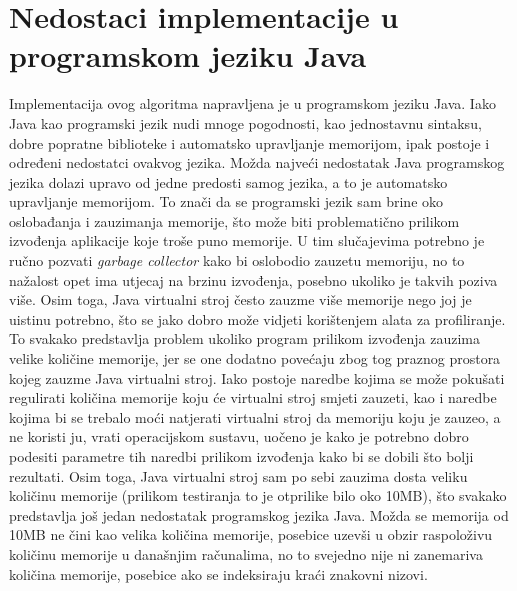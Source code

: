 \section{Nedostaci implementacije u programskom jeziku Java}
Implementacija ovog algoritma napravljena je u programskom jeziku Java.  Iako Java kao programski jezik nudi mnoge pogodnosti, kao jednostavnu sintaksu, dobre popratne biblioteke i automatsko upravljanje memorijom, ipak postoje i određeni nedostatci ovakvog jezika. Možda najveći nedostatak Java programskog jezika dolazi upravo od jedne predosti samog jezika, a to je automatsko upravljanje memorijom. To znači da se programski jezik sam brine oko oslobađanja i zauzimanja memorije, što može biti problematično prilikom izvođenja aplikacije koje troše puno memorije. U tim slučajevima potrebno je ručno pozvati \textit{garbage collector} kako bi oslobodio zauzetu memoriju, no to nažalost opet ima utjecaj na brzinu izvođenja, posebno ukoliko je takvih poziva više. Osim toga, Java virtualni stroj često zauzme više memorije nego joj je uistinu potrebno, što se jako dobro može vidjeti korištenjem alata za profiliranje. To svakako predstavlja problem ukoliko program prilikom izvođenja zauzima velike količine memorije, jer se one dodatno povećaju zbog tog praznog prostora kojeg zauzme Java virtualni stroj. Iako postoje naredbe kojima se može pokušati regulirati količina memorije koju će virtualni stroj smjeti zauzeti, kao i naredbe kojima bi se trebalo moći natjerati virtualni stroj da memoriju koju je zauzeo, a ne koristi ju, vrati operacijskom sustavu, uočeno je kako je potrebno dobro podesiti parametre tih naredbi prilikom izvođenja kako bi se dobili što bolji rezultati. Osim toga, Java virtualni stroj sam po sebi zauzima dosta veliku količinu memorije (prilikom testiranja to je otprilike bilo oko 10MB), što svakako predstavlja još jedan nedostatak programskog jezika Java. Možda se memorija od 10MB ne čini kao velika količina memorije, posebice uzevši u obzir raspoloživu količinu memorije u današnjim računalima, no to svejedno nije ni zanemariva količina memorije, posebice ako se indeksiraju kraći znakovni nizovi.

